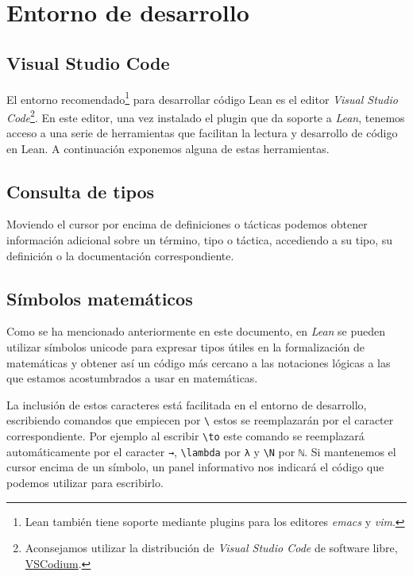 \section{Entorno de desarrollo}\label{sec:entorno}

\subsection*{Visual Studio Code}

El entorno recomendado\footnote{Lean también tiene soporte mediante plugins para
	los editores \textit{emacs} y \textit{vim}.} para desarrollar código
Lean es el editor \textit{Visual Studio Code}\footnote{Aconsejamos
	utilizar la distribución de \textit{Visual Studio Code} de software libre,
	\href{https://vscodium.com/}{VSCodium}.}. En este editor, una vez instalado el
plugin que da soporte a \textit{Lean}, tenemos acceso a una serie de
herramientas que facilitan la lectura y desarrollo de código en Lean. A
continuación exponemos alguna de estas herramientas.

\subsection*{Consulta de tipos}

Moviendo el cursor por encima de definiciones o tácticas podemos obtener
información adicional sobre un término, tipo o táctica, accediendo a su tipo, su
definición o la documentación correspondiente.

\subsection*{Símbolos matemáticos}

Como se ha mencionado anteriormente en este documento, en \textit{Lean} se
pueden utilizar símbolos unicode para expresar tipos útiles en la formalización
de matemáticas y obtener así un código más cercano a las notaciones lógicas a
las que estamos acostumbrados a usar en matemáticas.

La inclusión de estos caracteres está facilitada en el entorno de desarrollo,
escribiendo comandos que empiecen por \texttt{\textbackslash} estos se
reemplazarán por el caracter correspondiente. Por ejemplo al escribir
\texttt{\textbackslash to} este comando se reemplazará automáticamente por el
caracter \lstinline{→}, \texttt{\textbackslash lambda} por \lstinline{λ} y
\texttt{\textbackslash N} por \lstinline{ℕ}. Si mantenemos el cursor encima de
un símbolo, un panel informativo nos indicará el código que podemos utilizar
para escribirlo.


